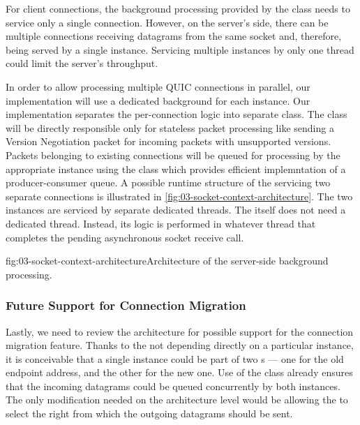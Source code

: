 For client connections, the background processing provided by the \QuicSocketContext{} class needs
to service only a single connection. However, on the server's side, there can be multiple
connections receiving datagrams from the same socket and, therefore, being served by a single
\QuicSocketContext{} instance. Servicing multiple \QuicConnection{} instances by only one thread
could limit the server's throughput.

In order to allow processing multiple QUIC connections in parallel, our implementation will use a
dedicated background \Task{} for each \QuicConnection{} instance. Our implementation separates the
per-connection logic into separate \QuicConnectionContext{} class. The \QuicSocketContext{} class
will be directly responsible only for stateless packet processing like sending a Version Negotiation
packet for incoming packets with unsupported versions. Packets belonging to existing connections
will be queued for processing by the appropriate \QuicConnectionContext{} instance using the
\ChannelOf{} class which provides efficient implemntation of a producer-consumer queue. A possible
runtime structure of the \QuicSocketContext{} servicing two separate connections is illustrated in
\autoref{fig:03-socket-context-architecture}. The two \QuicConnectionContext{} instances are
serviced by separate dedicated threads. The \QuicSocketContext{} itself does not need a dedicated
thread. Instead, its logic is performed in whatever thread that completes the pending asynchronous
socket receive call.

\begin{myFigure}{fig:03-socket-context-architecture}{Architecture of the server-side background
processing.}

\resizebox{0.88\textwidth}{!}{}

\end{myFigure}

\subsubsection{Future Support for Connection Migration}

Lastly, we need to review the architecture for possible support for the connection migration
feature. Thanks to the \QuicConnectionContext{} not depending directly on a particular \Socket{}
instance, it is conceivable that a single \QuicConnectionContext{} instance could be part of two
\QuicSocketContext{}s --- one for the old endpoint address, and the other for the new one. Use of
the \ChannelOf{} class already ensures that the incoming datagrams could be queued concurrently by
both \QuicSocketContext{} instances. The only modification needed on the architecture level would be
allowing the \QuicConnectionContext{} to select the right \Socket{} from which the outgoing
datagrams should be sent.

